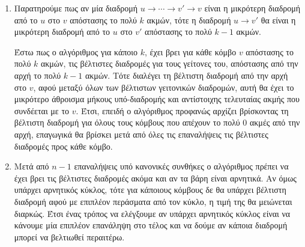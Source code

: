 \documentclass{assignment}
\begin{document}
\begin{enumerate}
\item
Παρατηρούμε πως αν μία διαδρομή $u\rightarrow\cdots\rightarrow v'\rightarrow v$
είναι η μικρότερη διαδρομή από το $u$ στο $v$ απόστασης το πολύ $k$ ακμών, 
τότε η διαδρομή $u\rightarrow v'$ θα είναι η μικρότερη διαδρομή από το $u$ 
στο $v'$ απόστασης το πολύ $k-1$ ακμών. 

Έστω πως ο αλγόριθμος για κάποιο $k$, έχει βρει για κάθε κόμβο $v$ απόστασης το
πολύ $k$ ακμών, τις βέλτιστες διαδρομές για τους γείτονες του, απόστασης από την
αρχή το πολύ $k-1$ ακμών. 
Τότε διαλέγει τη βέλτιστη διαδρομή από την αρχή στο $v$, αφού μεταξύ όλων 
των βέλτιστων γειτονικών διαδρομών, αυτή θα έχει το μικρότερο άθροισμα μήκους 
υπό-διαδρομής και αντίστοιχης τελευταίας ακμής που συνδέεται με το $v$.
Έτσι, επειδή ο αλγόριθμος προφανώς αρχίζει βρίσκοντας τη βέλτιστη διαδρομή για όλους τους κόμβους που απέχουν το πολύ 0 ακμές από την αρχή, επαγωγικά θα βρίσκει
μετά από όλες τις επαναλήψεις τις βέλτιστες διαδρομές προς κάθε κόμβο.

\item
Μετά από $n-1$ επαναλήψεις υπό κανονικές συνθήκες ο αλγόριθμος πρέπει
να έχει βρει τις βέλτιστες διαδρομές ακόμα και αν τα βάρη είναι αρνητικά.
Αν όμως υπάρχει αρνητικός κύκλος, τότε για κάποιους κόμβους δε θα 
υπάρχει βέλτιστη διαδρομή αφού με επιπλέον περάσματα από τον κύκλο, η τιμή 
της θα μειώνεται διαρκώς. Έτσι ένας τρόπος να ελέγξουμε
αν υπάρχει αρνητικός κύκλος είναι να κάνουμε μία επιπλέον επανάληψη στο τέλος
και να δούμε αν κάποια διαδρομή μπορεί να βελτιωθεί περαιτέρω.
\end{enumerate}
\end{document}
